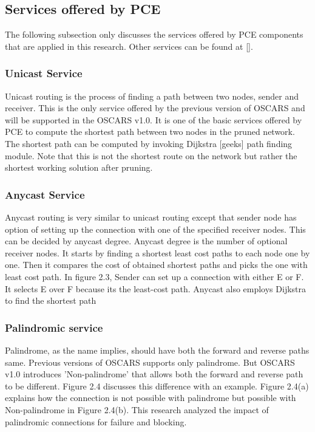 \subsection{Services offered by PCE}
The following subsection only discusses the services offered by PCE components that are applied in this research. Other services can be found at [].

\subsubsection{Unicast Service}
Unicast routing is the process of finding a path between two nodes, sender and receiver. This is the only service offered by the previous version of OSCARS and will be supported in the OSCARS v1.0. It is one of the basic services offered by PCE to compute the shortest path between two nodes in the pruned network. The shortest path can be computed by invoking Dijkstra [geeks] path finding module. Note that this is not the shortest route on the network but rather the shortest working solution after pruning. 

\subsubsection{Anycast Service}
Anycast routing is very similar to unicast routing except that sender node has option of setting up the connection with one of the specified receiver nodes. This can be decided by anycast degree. Anycast degree is the number of optional receiver nodes. It starts by finding a shortest least cost paths to each node one by one. Then it compares the cost of obtained shortest paths and picks the one with least cost path. In figure 2.3, Sender can set up a connection with either E or F. It selects E over F because its the least-cost path. Anycast also employs Dijkstra to find the shortest path

\subsubsection{Palindromic service}
Palindrome, as the name implies, should have both the forward and reverse paths same. Previous versions of OSCARS supports only palindrome. But OSCARS v1.0 introduces 'Non-palindrome' that allows both the forward and reverse path to be different. Figure 2.4 discusses this difference with an example. Figure 2.4(a) explains how the connection is not possible with palindrome but possible with Non-palindrome in Figure 2.4(b). This research analyzed the impact of palindromic connections for failure and blocking.


